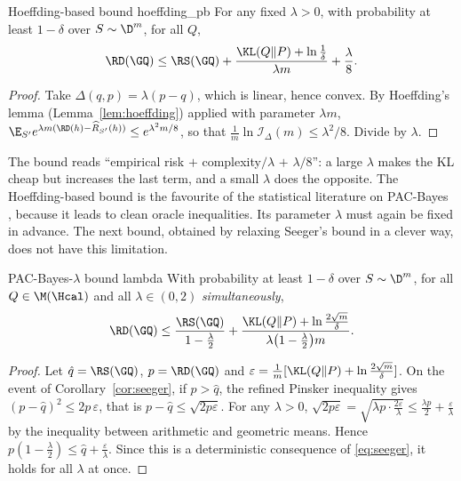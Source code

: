 \begin{corollary}{Hoeffding-based bound \citep{catoni2007pac,alquier2024user}}{hoeffding_pb}
For any fixed $\lambda>0$, with probability at least $1-\delta$ over $S\sim\D^m$, for all $Q$,
\begin{equation}\label{eq:catoni_hoeffding}
\RD(\GQ)\leq\RS(\GQ)+\frac{\KL(Q\|P)+\ln\frac1\delta}{\lambda m}+\frac{\lambda}{8}.
\end{equation}
\end{corollary}
\begin{proof}
Take $\Delta(q,p)=\lambda(p-q)$, which is linear, hence convex. By Hoeffding's
lemma (Lemma~\ref{lem:hoeffding}) applied with parameter $\lambda m$,
$\E_{S'}e^{\lambda m(\RD(h)-\widehat R_{S'}(h))}\leq e^{\lambda^2m/8}$, so that
$\frac1m\ln\mathcal I_\Delta(m)\leq\lambda^2/8$. Divide by $\lambda$.
\end{proof}

The bound reads ``empirical risk $+$ complexity$/\lambda$ $+$ $\lambda/8$'': a
large $\lambda$ makes the KL cheap but increases the last term, and a small
$\lambda$ does the opposite. The Hoeffding-based bound is the favourite of the
statistical literature on PAC-Bayes \citep{alquier2024user}, because it leads to clean oracle inequalities.
Its parameter $\lambda$ must again be fixed in advance. The next bound, obtained
by relaxing Seeger's bound in a clever way, does not have this limitation.

\begin{corollary}{PAC-Bayes-$\lambda$ bound \citep{thiemann2017strongly}}{lambda}
With probability at least $1-\delta$ over $S\sim\D^m$, for all $Q\in\M(\Hcal)$ and all
$\lambda\in(0,2)$ \emph{simultaneously},
\begin{equation}\label{eq:lambda}
\RD(\GQ)\leq\frac{\RS(\GQ)}{1-\frac\lambda2}+\frac{\KL(Q\|P)+\ln\frac{2\sqrt m}{\delta}}{\lambda\big(1-\frac\lambda2\big)m}.
\end{equation}
\end{corollary}
\begin{proof}
Let $\hat q=\RS(\GQ)$, $p=\RD(\GQ)$ and $\varepsilon=\frac1m[\KL(Q\|P)+\ln\frac{2\sqrt m}\delta]$.
On the event of Corollary~\ref{cor:seeger}, if $p>\hat q$, the refined Pinsker inequality gives
$(p-\hat q)^2\leq2p\,\varepsilon$, that is $p-\hat q\leq\sqrt{2p\varepsilon}$.
For any $\lambda>0$, $\sqrt{2p\varepsilon}=\sqrt{\lambda p\cdot\frac{2\varepsilon}{\lambda}}\leq\frac{\lambda p}{2}+\frac{\varepsilon}{\lambda}$
by the inequality between arithmetic and geometric means.
Hence $p(1-\frac\lambda2)\leq\hat q+\frac\varepsilon\lambda$. Since this is a
deterministic consequence of \eqref{eq:seeger}, it holds for all $\lambda$ at once.
\end{proof}

